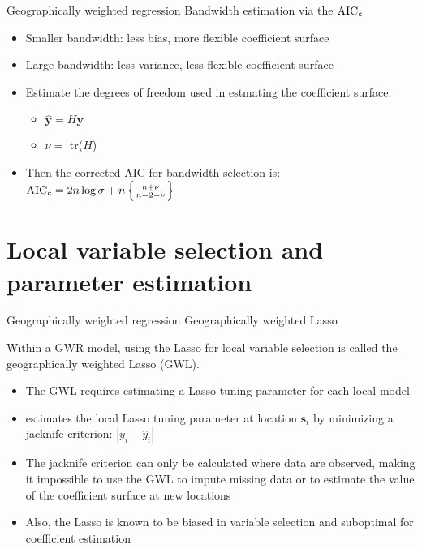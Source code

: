 \documentclass[12pt,t]{beamer}
\newcommand{\subt}[1]{{\footnotesize \color{subtitle} {#1}}}
\begin{document}
\begin{frame}{Geographically weighted regression}
\subt{Bandwidth estimation via the $\text{AIC}_{\tt c}$ \citep{Hurvich:1998}}

\bigskip
\begin{itemize}
    \item Smaller bandwidth: less bias, more flexible coefficient surface
    \item Large bandwidth: less variance, less flexible coefficient surface
    \item Estimate the degrees of freedom used in estmating the coefficient surface:
    \begin{itemize}
        \item $\hat{\bm{y}} = H\bm{y}$
        \item $\nu = $ tr($H$)
    \end{itemize}
    \item Then the corrected AIC for bandwidth selection is: $\text{AIC}_{\tt c} = 2 n \log{\sigma} + n \left\{\frac{n + \nu}{n - 2 - \nu}\right\}$
\end{itemize}

\end{frame}







\section{Local variable selection and parameter estimation}



\begin{frame}{Geographically weighted regression}
\subt{Geographically weighted Lasso \citep{Wheeler:2009}}

\bigskip
Within a GWR model, using the Lasso for local variable selection is called the geographically weighted Lasso (GWL).
\begin{itemize}
    \item The GWL requires estimating a Lasso tuning parameter for each local model
    \item \cite{Wheeler:2009} estimates the local Lasso tuning parameter at location $\bm{s}_i$ by minimizing a jacknife criterion: $|y_i - \hat{y}_i|$
    \item The jacknife criterion can only be calculated where data are observed, making it impossible to use the GWL to impute missing data or to estimate the value of the coefficient surface at new locations
    \item Also, the Lasso is known to be biased in variable selection and suboptimal for coefficient estimation
\end{itemize}

\end{frame}
\end{document}
